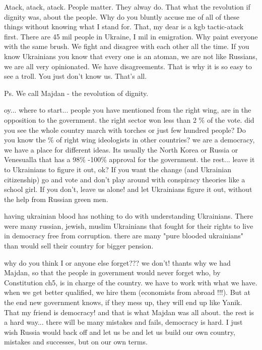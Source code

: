 \begin{itemize}
\begin{itemize}
Atack, atack, atack. People matter. They alway do. That what the revolution if
dignity was, about the people. Why do you bluntly accuse me of all of these
things without knowing what I stand for. That, my dear is a kgb tactic-atack
first. There are 45 mil people in Ukraine, I mil in emigration. Why paint
everyone with the same brush. We fight and disagree with each other all the
time. If you know Ukrainians you know that every one is an atoman, we are not
like Russians, we are all very opinionated. We have disagreements. That is why
it is so easy to see a troll. You just don't know us. That's all.

Ps. We call Majdan - the revolution of dignity.


oy... where to start... people you have mentioned from the right wing, are in
the opposition to the government. the right sector won less than 2 \% of the
vote. did you see the whole country march with torches or just few hundred
people? Do you know the \% of right wing ideologists in other countries? we are
a democracy, we have a place for different ideas. Its usually the North Korea
or Russia or Venesualla that has a 98\% -100\% approval for the government. the
rest... leave it to Ukrainians to figure it out, ok? If you want the change
(and Ukrainian citizenship) go and vote and don't play around with conspiracy
theories like a school girl. If you don't, leave us alone! and let Ukrainians
figure it out, without the help from Russian green men.



having ukrainian blood has nothing to do with understanding Ukrainians. There
were many russian, jewish, muslim Ukrainians that fought for their rights to
live in democracy free from corruption. there are many "pure blooded
ukrainians" than would sell their country for bigger pension.


why do you think I or anyone else forget??? we don't! thants why we had Majdan,
so that the people in government would never forget who, by Constitution ch5,
is in charge of the country. we have to work with what we have. when we get
better qualified, we hire them (economists from abroad !!!). But at the end new
government knows, if they mess up, they will end up like Yanik. That my friend
is democracy! and that is what Majdan was all about. the rest is a hard way...
there will be many mistakes and fails, democracy is hard. I just wish Russia
would back off and let us be and let us build our own country, mistakes and
successes, but on our own terms.


\end{itemize}
\end{itemize}
